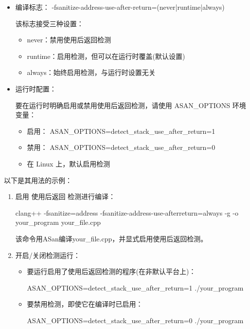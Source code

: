 \begin{itemize}
\item
编译标志： -fsanitize-address-use-after-return=(never|runtime|always)

该标志接受三种设置：

\begin{itemize}
\item
never：禁用使用后返回检测

\item
runtime：启用检测，但可以在运行时覆盖(默认设置)

\item
always：始终启用检测，与运行时设置无关
\end{itemize}

\item
运行时配置：

要在运行时明确启用或禁用使用后返回检测，请使用 ASAN\_OPTIONS 环境变量：

\begin{itemize}
\item
启用： ASAN\_OPTIONS=detect\_stack\_use\_after\_return=1

\item
禁用： ASAN\_OPTIONS=detect\_stack\_use\_after\_return=0

\item
在 Linux 上，默认启用检测
\end{itemize}

\end{itemize}

以下是其用法的示例：

\begin{enumerate}
\item
启用 使用后返回 检测进行编译：

\begin{shell}
clang++ -fsanitize=address -fsanitize-address-use-afterreturn=always -g -o your_program your_file.cpp
\end{shell}

该命令用ASan编译your\_file.cpp，并显式启用使用后返回检测。

\item
开启/关闭检测运行：

\begin{itemize}
\item
要运行启用了使用后返回检测的程序(在非默认平台上)：

\begin{shell}
ASAN_OPTIONS=detect_stack_use_after_return=1 ./your_program
\end{shell}

\item
要禁用检测，即使它在编译时已启用：

\begin{shell}
ASAN_OPTIONS=detect_stack_use_after_return=0 ./your_program
\end{shell}
\end{itemize}
\end{enumerate}

